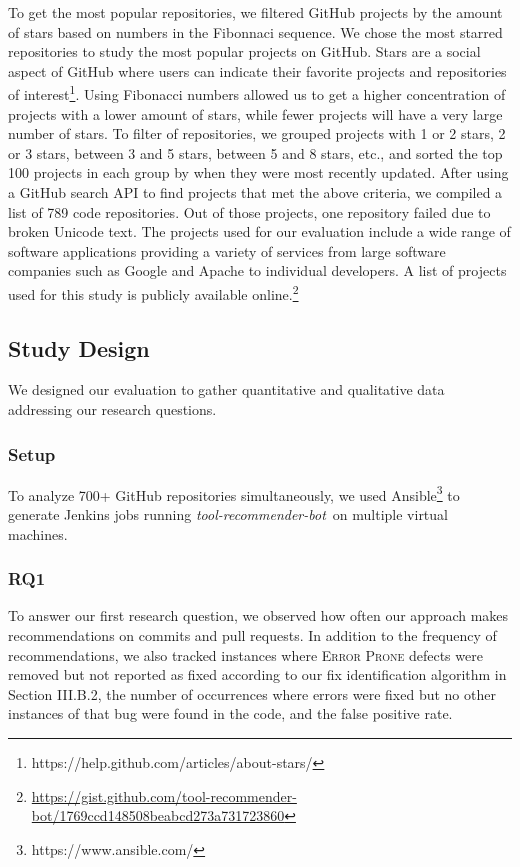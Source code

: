 \documentclass[sigconf,review,anonymous]{acmart}
\newcommand{\tool}{\textsl{tool-recommender-bot}}
\begin{document}
To get the most popular repositories, we filtered GitHub projects by the amount of stars based on numbers in the Fibonnaci sequence. We chose the most starred repositories to study the most popular projects on GitHub. Stars are a social aspect of GitHub where users can indicate their favorite projects and repositories of interest\footnote{https://help.github.com/articles/about-stars/}. Using Fibonacci numbers allowed us to get a higher concentration of projects with a lower amount of stars, while fewer projects will have a very large number of stars. To filter of repositories, we grouped projects with 1 or 2 stars, 2 or 3 stars, between 3 and 5 stars, between 5 and 8 stars, etc., and sorted the top 100 projects in each group by when they were most recently updated. After using a GitHub search API to find projects that met the above criteria, we compiled a list of 789 code repositories. Out of those projects, one repository failed due to broken Unicode text. %
The projects used for our evaluation include a wide range of software applications providing a variety of services from large software companies such as Google and Apache to individual developers. A list of projects used for this study is publicly available online.\footnote{\url{https://gist.github.com/tool-recommender-bot/1769ccd148508beabcd273a731723860}}

\subsection{Study Design}

We designed our evaluation to gather quantitative and qualitative data addressing our research questions.  

\subsubsection{Setup}

To analyze 700+ GitHub repositories simultaneously, we used Ansible\footnote{https://www.ansible.com/} to generate Jenkins jobs running \tool~on multiple virtual machines.

\subsubsection{RQ1}

To answer our first research question, we observed how often our approach makes recommendations on commits and pull requests. In addition to the frequency of recommendations, we also tracked instances where \textsc{Error Prone} defects were removed but not reported as fixed according to our fix identification algorithm in Section III.B.2, the number of occurrences where errors were fixed but no other instances of that bug were found in the code, and the false positive rate.
\end{document}
